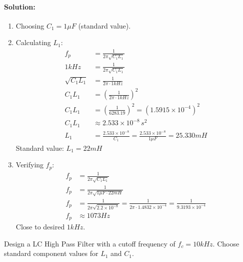 \paragraph{Solution:}
\begin{enumerate}
  \item Choosing \(C_1 = 1 \mu F\) (standard value).
  \item Calculating \(L_1\):
    \begin{align*}
      f_p &= \frac{1}{2 \pi \sqrt{C_1L_1}} \\
      1 kHz &= \frac{1}{2 \pi \sqrt{C_1L_1}} \\
      \sqrt{C_1L_1} &= \frac{1}{2 \pi \cdot 1 kHz} \\
      C_1L_1 &= \left( \frac{1}{2 \pi \cdot 1 kHz} \right)^2 \\
      C_1L_1 &= \left( \frac{1}{6283.19} \right)^2 = (1.5915 \times 10^{-4})^2 \\
      C_1L_1 &\approx 2.533 \times 10^{-8} \, s^2 \\
      L_1 &= \frac{2.533 \times 10^{-8}}{C_1} = \frac{2.533 \times 10^{-8}}{1 \mu F} = 25.330 mH
    \end{align*}
    Standard value: \(L_1 = 22 mH\)
  \item Verifying \(f_p\):
    \begin{align*}
      f_p &= \frac{1}{2 \pi \sqrt{C_1L_1}} \\
      f_p &= \frac{1}{2 \pi \sqrt{1 \mu F \cdot 22 mH}} \\
      f_p &= \frac{1}{2 \pi \sqrt{2.2 \times 10^{-8}}} = \frac{1}{2 \pi \cdot 1.4832 \times 10^{-4}} = \frac{1}{9.3193 \times 10^{-4}} \\
      f_p &\approx 1073 Hz
    \end{align*}
    Close to desired \(1 kHz\).
\end{enumerate}
Design a LC High Pass Filter with a cutoff frequency of
\(f_c = 10 kHz\). Choose standard component values for \(L_1\)
and \(C_1\).

